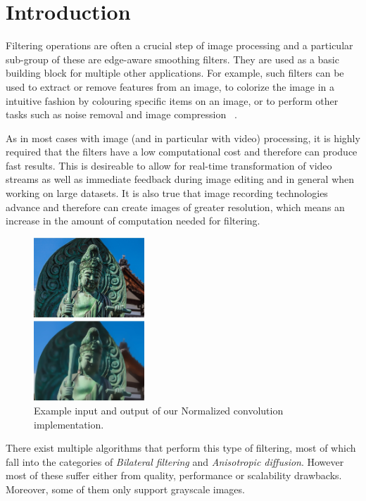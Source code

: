 \section{Introduction}\label{sec:intro}

Filtering operations are often a crucial step of image processing and a particular sub-group of these are edge-aware smoothing filters. 
They are used as a basic building block for multiple other applications.
For example, such filters can be used to extract or remove features from an
image, to colorize the image in a intuitive fashion by colouring specific
items on an image, or to perform other tasks such as noise removal and
image compression ~\cite{GastalOliveira2011DomainTransform}.

As in most cases with image (and in particular with video) processing, it is highly required that the filters have a low computational cost and therefore can produce fast results. This is desireable to allow for real-time transformation of video streams as well as immediate feedback during image editing and in general when working on large datasets. 
It is also true that image recording technologies advance and therefore can create images of greater resolution, which means an increase in
the amount of computation needed for filtering.

\setlength\fboxsep{0pt}
\setlength\fboxrule{0.5pt}
 
\begin{figure}\vspace{-1mm}
  \includegraphics[trim=-30mm 0mm 0mm 0mm, clip, width=0.37\textwidth]{figures/input_output}
  \caption{Example input and output of our Normalized convolution implementation.\label{performance}}
\end{figure}


There exist multiple algorithms that perform this type of filtering, most of which fall into the categories of \textit{Bilateral filtering} and \textit{Anisotropic diffusion}. However most of these suffer either from quality, performance or scalability drawbacks. Moreover, some of them only support grayscale images.


